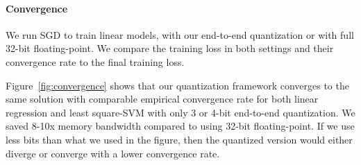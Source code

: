 \documentclass{article}
\begin{document}
\paragraph{Convergence}
We run SGD to train linear models, with our end-to-end quantization or with full 32-bit floating-point. We compare the training loss in both settings and their convergence rate to the final training loss.

Figure~\ref{fig:convergence} shows that our quantization framework
converges to the same solution with comparable
empirical convergence rate for both linear regression and least square-SVM
with only 3 or 4-bit end-to-end quantization. We saved 8-10x memory bandwidth compared to using 32-bit floating-point. If we use less bits than what we used in the figure, then the quantized version would either diverge or converge with a lower convergence rate.
\end{document}
